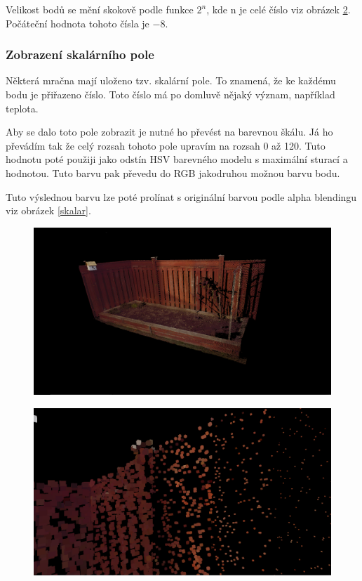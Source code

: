 Velikost bodů se mění skokově podle funkce $ 2^n $, kde n je celé číslo viz obrázek \ref{velikosti}. Počáteční hodnota tohoto čísla je $ -8 $.

\subsubsection{Zobrazení skalárního pole}

Některá mračna mají uloženo tzv. skalární pole. To znamená, že ke každému bodu je přiřazeno číslo. Toto číslo má po domluvě nějaký význam, například teplota.

Aby se dalo toto pole zobrazit je nutné ho převést na barevnou škálu. Já ho převádím tak že celý rozsah tohoto pole upravím na rozsah 0 až 120. Tuto hodnotu poté použiji jako odstín HSV barevného modelu s maximální sturací a hodnotou. Tuto barvu pak převedu do RGB jakodruhou možnou barvu bodu.

Tuto výslednou barvu lze poté prolínat s originální barvou podle alpha blendingu\cite{alpha-blending} viz obrázek \ref{skalar}.


\begin{figure}
	\centering
	\includegraphics[keepaspectratio,width=\textwidth]{obrazky/mrak}
	\label{mrak}
\end{figure}

\begin{figure}
	\centering
	\includegraphics[keepaspectratio,width=\textwidth]{obrazky/velikosti}
	\label{velikosti}
\end{figure}

